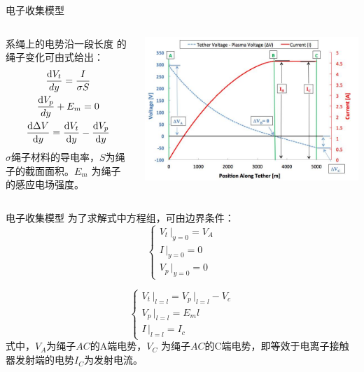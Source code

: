 \documentclass[sectioncirclenumberstyle]{le2iutbmbeamer}
\begin{document}
\begin{frame}{电子收集模型}
\begin{columns}
\begin{column}{.4\linewidth}
系绳上的电势沿一段长度 的绳子变化可由式给出：
\begin{gather}
\frac{\mathrm{d} V_t } {dy} =\frac{I} {\sigma S }\notag\\
\frac{\mathrm{d}V_p }  {dy}+E_m =0\notag\\
\frac{\mathrm{d} \Delta V } {\mathrm{d} y }  =\frac{\mathrm{d} V_t} {\mathrm {d} y}-\frac{\mathrm{d} V_p} {\mathrm{d}y }\notag
\end{gather}\label{eq:voltage and current}
$\sigma$绳子材料的导电率，$S$为绳子的截面面积。$E_m$ 为绳子的感应电场强度。%
\end{column}
\begin{column}{.7\linewidth}
\centering
\includegraphics[width=\linewidth]{figures/IVdemo}
\end{column}
\end{columns}
\end{frame}

\begin{frame}{电子收集模型}
为了求解式中方程组，可由边界条件：
\[
\begin{cases}
V_t  \, \vert_ {y=0} =V_A \\
I \, \vert_ {y=0 } =0 \\
V_p \,  \vert_ {y=0} =0
\end{cases}
\]

\[
\begin{cases}
V_t  \, \vert_ {l=l} =V_p  \, \vert_ {l=l} -V_c \\
V_p \,  \vert_ {l=l} =E_m l \\
I \, \vert_ {l=l } =I_c
\end{cases}
\]
式中，$V_A$为绳子$AC$的A端电势，$V_C$ 为绳子$AC$的C端电势，即等效于电离子接触器发射端的电势$I_C$为发射电流。
\end{frame}
\end{document}
